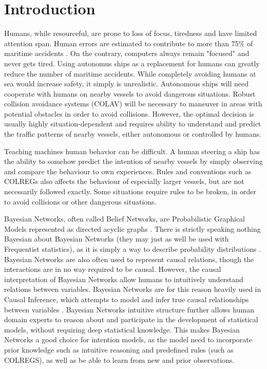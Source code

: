 \chapter{Introduction}

Humans, while resourceful, are prone to loss of focus, tiredness and have limited attention span. Human errors are estimated to contribute to more than $75\%$ of maritime accidents \cite{Tengesdal2020RiskbasedAM}. On the contrary, computers always remain "focused" and never gets tired. Using autonomus ships as a replacement for humans can greatly reduce the number of maritime accidents.
While completely avoiding humans at sea would increase safety, it simply is unrealistic. Autonomous ships will need cooperate with humans on nearby vessels to avoid dangerous situations. Robust collision avoidance systems (COLAV) will be necessary to  maneuver in areas with potential obstacles in order to avoid collisions. However, the optimal decision is usually highly situation-dependent and requires ability to understand and predict the traffic patterns of nearby vessels, either autonomous or controlled by humans.  

Teaching machines human behavior can be difficult. A human steering a ship has the ability to somehow predict the intention of nearby vessels by simply observing and compare the behaviour to own experiences. Rules and conventions such as COLREGs \cite{colreg} also affects the behaviour of especially larger vessels, but are not necessarily followed exactly. Some situations require rules to be broken, in order to avoid collisions or other dangerous situations. 

Bayesian Networks, often called Belief Networks, are Probabilistic Graphical Models represented as directed acyclic graphs \cite{murphy}. There is strictly speaking nothing Bayesian about Bayesian Networks (they may just as well be used with Frequentist statistics), as it is simply a way to describe probability distributions \cite{murphy}. Bayesian Networks are also often used to represent causal relations, though the interactions are in no way required to be causal. However, the causal interpretation of Bayesian Networks allow humans to intuitively understand relations between variables. Bayesian Networks are for this reason heavily used in Causal Inference, which attempts to model and infer true causal relationships between variables \cite{causal}. Bayesian Networks intuitive structure further allows human domain experts to reason about and participate in the development of statistical models, without requiring deep statistical knowledge. 
This makes Bayesian Networks a good choice for intention models, as the model need to incorporate prior knowledge such as intuitive reasoning and predefined rules (such as COLREGS), as well as be able to learn from new and prior observations. 

